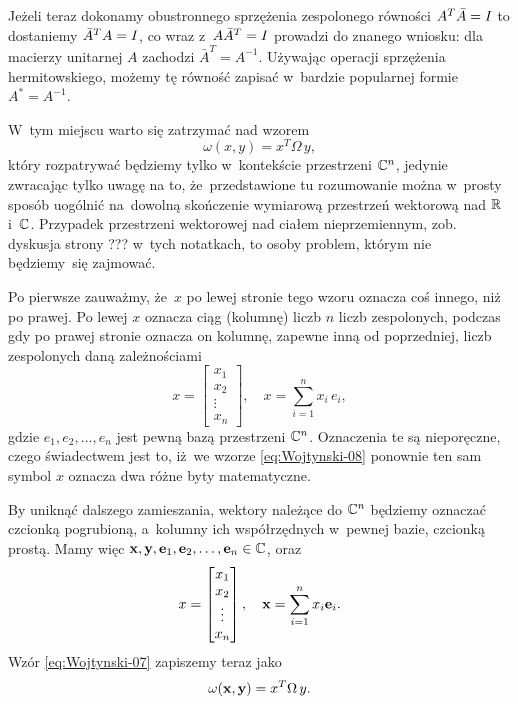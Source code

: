 \documentclass[a4paper,11pt]{article}
\begin{document}
Jeżeli teraz dokonamy obustronnego sprzężenia zespolonego równości
$A^{ T } \bar{A} = I$ to dostaniemy $\bar{A}^{ T } A = I$, co
wraz z~$A \bar{A}^{ T } = I$ prowadzi do znanego wniosku: dla
macierzy unitarnej $A$ zachodzi $\bar{A}^{ T } = A^{ -1 }$. Używając
operacji sprzężenia hermitowskiego, możemy tę równość zapisać w~bardzie
popularnej formie $A^{ * } = A^{ -1 }$.

\vspace{\spaceFour}





 W~tym miejscu warto się zatrzymać nad wzorem
\begin{equation}
  \label{eq:Wojtynski-07}
  \omega( x, y ) = x^{ T } \Omega \, y,
\end{equation}
który rozpatrywać będziemy tylko w~kontekście przestrzeni $\mathbb{C}^{ n }$,
jedynie zwracając tylko uwagę na to, że~przedstawione tu rozumowanie można
w~prosty sposób uogólnić na~dowolną skończenie wymiarową przestrzeń
wektorową nad $\mathbb{R}$ i~$\mathbb{C}$. Przypadek przestrzeni wektorowej nad ciałem
nieprzemiennym, zob. dyskusja strony ??? w~tych notatkach, to osoby
problem, którym nie będziemy~się zajmować.

Po pierwsze zauważmy, że~$x$ po lewej stronie tego wzoru oznacza coś
innego, niż po prawej. Po lewej $x$ oznacza ciąg (kolumnę) liczb $n$ liczb
zespolonych, podczas gdy po prawej stronie oznacza on kolumnę, zapewne inną
od poprzedniej, liczb zespolonych daną zależnościami
\begin{equation}
  \label{eq:Wojtynski-08}
  x =
  \begin{bmatrix}
    x_{ 1 } \\
    x_{ 2 } \\
    \vdots \\
    x_{ n }
  \end{bmatrix}, \quad
  x = \sum_{ i = 1 }^{ n } x_{ i } \, e_{ i },
\end{equation}
gdzie $e_{ 1 }, e_{ 2 }, \ldots, e_{ n }$ jest pewną bazą przestrzeni $\mathbb{C}^{ n }$.
Oznaczenia te są nieporęczne, czego świadectwem jest to, iż~we wzorze
\eqref{eq:Wojtynski-08} ponownie ten sam symbol $x$ oznacza dwa różne
byty matematyczne.

By uniknąć dalszego zamieszania, wektory należące do
$\mathbb{C}^{ n }$ będziemy oznaczać czcionką pogrubioną, a~kolumny ich
współrzędnych w~pewnej bazie, czcionką prostą. Mamy więc
$\mathbf{x}, \mathbf{y}, \mathbf{e}_{ 1 }, \mathbf{e}_{ 2 }, \ldots, \mathbf{e}_{ n }
\in \mathbb{C}$, oraz
\begin{equation}
  \label{eq:Wojtynski-09}
  x =
  \begin{bmatrix}
    x_{ 1 } \\
    x_{ 2 } \\
    \vdots \\
    x_{ n }
  \end{bmatrix}, \quad
  \mathbf{x} = \sum_{ i = 1 }^{ n } x_{ i } \mathbf{e}_{ i }.
\end{equation}
Wzór \eqref{eq:Wojtynski-07} zapiszemy teraz jako
\begin{equation}
  \label{eq:Wojtynski-10}
  \omega( \mathbf{x}, \mathbf{y} ) = x^{ T } \Omega \, y.
\end{equation}
\end{document}
